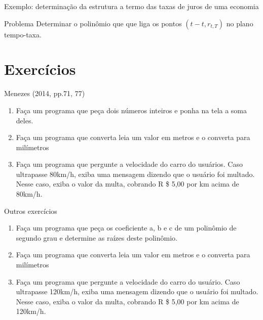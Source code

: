 \documentclass{beamer}
\begin{document}
	\begin{frame}{Exemplo: determinação da estrutura a termo das taxas de juros de uma economia}
		\begin{block}{Problema}
			Determinar o polinômio que que liga os pontos \begin{math}
			(t-t, r_{t,T})
			\end{math} no plano tempo-taxa.
		\end{block}
	\end{frame}
	
	
	
	
	
	
	
	\section{Exercícios}
	
	
	
	\begin{frame}{Menezes (2014, pp.71, 77)}
		\begin{enumerate}
			\item Faça um programa que peça dois números inteiros e ponha na tela a soma deles.
			\item Faça um programa que converta leia um valor em metros e o converta para milímetros
			\item Faça um programa que pergunte a velocidade do carro do usuários.  Caso ultrapasse 80km/h, exiba uma mensagem dizendo que o usuário foi multado.  Nesse caso, exiba o valor da multa, cobrando R \$ 5,00 por km acima de 80km/h.
		\end{enumerate}
	\end{frame}
	
	
	
	
	
	
	\begin{frame}{Outros exercícios}
		\begin{enumerate}
			\item Faça um programa que peça os coeficiente a, b e c de um polinômio de segundo grau e determine as raízes deste polinômio.
			\item Faça um programa que converta leia um valor em metros e o converta para milímetros
			\item Faça um programa que pergunte a velocidade do carro do usuário.  Caso ultrapasse 120km/h, exiba uma mensagem dizendo que o usuário foi multado.  Nesse caso, exiba o valor da multa, cobrando R \$ 5,00 por km acima de 120km/h.
			
		\end{enumerate}
		
	\end{frame}
	
\end{document}
